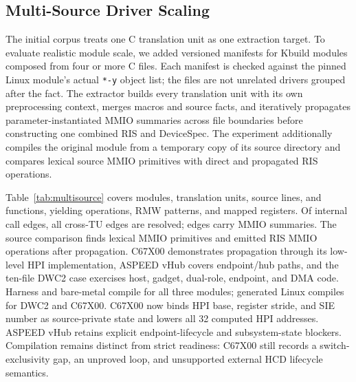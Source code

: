 \documentclass[sigconf,review]{acmart}
\begin{document}
\subsection{Multi-Source Driver Scaling}

The initial corpus treats one C translation unit as one extraction target. To evaluate realistic module scale, we added versioned manifests for Kbuild modules composed from four or more C files. Each manifest is checked against the pinned Linux module's actual \texttt{*-y} object list; the files are not unrelated drivers grouped after the fact. The extractor builds every translation unit with its own preprocessing context, merges macros and source facts, and iteratively propagates parameter-instantiated MMIO summaries across file boundaries before constructing one combined RIS and DeviceSpec. The experiment additionally compiles the original module from a temporary copy of its source directory and compares lexical source MMIO primitives with direct and propagated RIS operations.

\begin{table}[t]
\centering
\caption{Real multi-source Linux driver modules. X-TU is the number of resolved cross-translation-unit call edges and Prop is the number of call edges carrying MMIO summaries. H/B/L reports generated-backend compilation. $\dagger$ denotes a successful original Kbuild compile/link after warning-only modpost retry because the fixed experiment kernel omits USB core exports.}
\label{tab:multisource}
\resizebox{\columnwidth}{!}{\MultiSourceResultsTable}
\end{table}

Table~\ref{tab:multisource} covers \MultiSourceDrivers{} modules, \MultiSourceTUs{} translation units, \MultiSourceLines{} source lines, and \MultiSourceFunctions{} functions, yielding \MultiSourceOps{} operations, \MultiSourceRMW{} RMW patterns, and \MultiSourceRegisters{} mapped registers. Of \MultiSourceCallEdges{} internal call edges, all \MultiSourceCrossTUEdges{} cross-TU edges are resolved; \MultiSourcePropagatedEdges{} edges carry MMIO summaries. The source comparison finds \MultiSourceSourceMMIO{} lexical MMIO primitives and \MultiSourceRISMMIO{} emitted RIS MMIO operations after propagation. C67X00 demonstrates propagation through its low-level HPI implementation, ASPEED vHub covers endpoint/hub paths, and the ten-file DWC2 case exercises host, gadget, dual-role, endpoint, and DMA code. Harness and bare-metal compile for all three modules; generated Linux compiles for DWC2 and C67X00. C67X00 now binds HPI base, register stride, and SIE number as source-private state and lowers all 32 computed HPI addresses. ASPEED vHub retains explicit endpoint-lifecycle and subsystem-state blockers. Compilation remains distinct from strict readiness: C67X00 still records a switch-exclusivity gap, an unproved loop, and unsupported external HCD lifecycle semantics.
\end{document}
